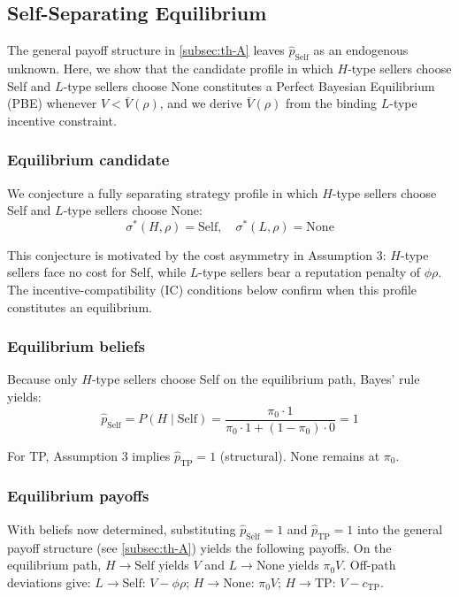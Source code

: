 \documentclass[11pt,letterpaper]{article}
\theoremstyle{definition}
\begin{document}
\subsection{Self-Separating Equilibrium}\label{subsec:th-B}

The general payoff structure in \ref{subsec:th-A} leaves $\hat{p}_{\text{Self}}$ as an endogenous unknown. Here, we show that the candidate profile in which $H$-type sellers choose Self and $L$-type sellers choose None constitutes a Perfect Bayesian Equilibrium (PBE) whenever $V < \bar{V}(\rho)$, and we derive $\bar{V}(\rho)$ from the binding $L$-type incentive constraint.

\subsubsection*{Equilibrium candidate}

We conjecture a fully separating strategy profile in which $H$-type sellers choose Self and $L$-type sellers choose None:
\[\sigma^*(H, \rho) = \text{Self}, \quad \sigma^*(L, \rho) = \text{None}\]

This conjecture is motivated by the cost asymmetry in Assumption 3: $H$-type sellers face no cost for Self, while $L$-type sellers bear a reputation penalty of $\phi\rho$. The incentive-compatibility (IC) conditions below confirm when this profile constitutes an equilibrium.

\subsubsection*{Equilibrium beliefs}

Because only $H$-type sellers choose Self on the equilibrium path, Bayes' rule yields:
\[\hat{p}_{\text{Self}} = P(H \mid \text{Self}) = \frac{\pi_0 \cdot 1}{\pi_0 \cdot 1 + (1 - \pi_0) \cdot 0} = 1\]

For TP, Assumption 3 implies $\hat{p}_{\text{TP}} = 1$ (structural). None remains at $\pi_0$.

\subsubsection*{Equilibrium payoffs}

With beliefs now determined, substituting $\hat{p}_{\text{Self}} = 1$ and $\hat{p}_{\text{TP}} = 1$ into the general payoff structure (see \ref{subsec:th-A}) yields the following payoffs. On the equilibrium path, $H \to \text{Self}$ yields $V$ and $L \to \text{None}$ yields $\pi_0 V$. Off-path deviations give: $L \to \text{Self}$: $V - \phi\rho$; $H \to \text{None}$: $\pi_0 V$; $H \to \text{TP}$: $V - c_{\text{TP}}$.
\end{document}

